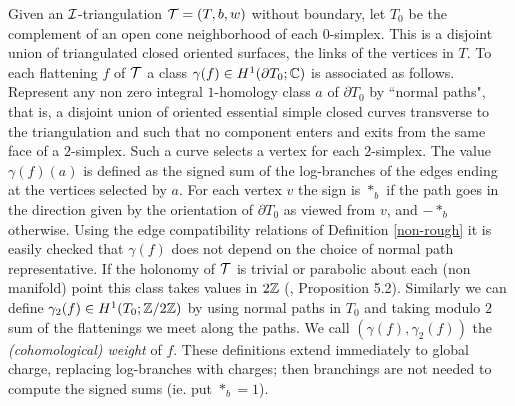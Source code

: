  Given
an ${\mathcal I}$-triangulation ${\mathcal T}=(T,b,w)$ without boundary, let $T_0$
be the complement of an open cone neighborhood of each
$0$-simplex. This is a disjoint union of triangulated closed
oriented surfaces, the links of the vertices in $T$. To each
flattening $f$ of ${\mathcal T}$ a class $\gamma(f) \in H^1(\partial
T_0;\mathbb{C})$ is associated as follows.  Represent any non zero
integral $1$-homology class $a$ of $\partial T_0$ by ``normal
paths", that is, a disjoint union of oriented essential simple
closed curves transverse to the triangulation and such that no
component enters and exits from the same face of a $2$-simplex.
Such a curve selects a vertex for each $2$-simplex. The value
$\gamma(f)(a)$ is defined as the signed sum of the log-branches of
the edges ending at the vertices selected by $a$. For each vertex
$v$ the sign is $*_b$ if the path goes in the direction given by
the orientation of $\partial T_0$ as viewed from $v$, and $-*_b$
otherwise. Using the edge compatibility relations of Definition
\ref{non-rough} it is easily checked that $\gamma(f)$ does not
depend on the choice of normal path representative. If the
holonomy of ${\mathcal T}$ is trivial or parabolic about each (non
manifold) point this class takes values in $2\mathbb{Z}$ (\cite{N},
Proposition 5.2). Similarly we can define $\gamma_2(f) \in
H^1(T_0;\mathbb{Z}/2\mathbb{Z})$ by using normal paths in $T_0$ and taking
modulo $2$ sum of the flattenings we meet along the paths. We call
$(\gamma(f),\gamma_2(f))$ the {\it (cohomological) weight} of $f$.
These definitions extend immediately to global charge, replacing
log-branches with charges; then branchings are not needed to
compute the signed sums (ie. put $*_b=1$).

